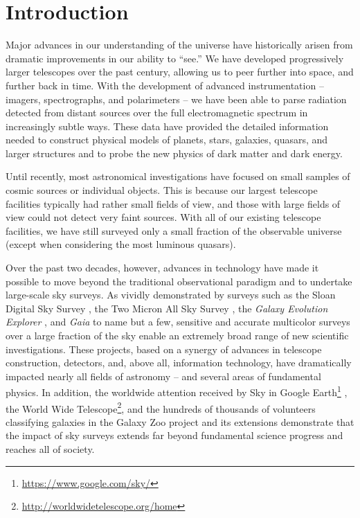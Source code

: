 \section{Introduction}

Major advances in our understanding of the universe have historically arisen
from dramatic improvements in our ability to ``see.'' We have developed
progressively larger telescopes over the past century, allowing us
to peer further into space, and further back in time. With the development of
advanced instrumentation -- imagers, spectrographs, and polarimeters -- we
have been able to parse radiation detected from distant sources over the
full electromagnetic spectrum in increasingly subtle ways.
These data have provided the detailed information needed to construct physical
models of planets, stars, galaxies, quasars, and larger structures and to probe the
new physics of dark matter and dark energy.

Until recently, most astronomical investigations have focused on small samples
of cosmic sources or individual objects. This is because our largest telescope
facilities typically had rather small fields of view, and those with large
fields of view could not detect very faint sources. With all of our existing
telescope facilities, we have still surveyed only a small fraction of the
observable universe (except when considering the most luminous quasars).

Over the past two decades, however, advances in technology have made it possible to
move beyond the traditional observational paradigm and to undertake large-scale
sky surveys. As vividly demonstrated by surveys such as the Sloan Digital Sky
Survey \citep[SDSS;][]{2000AJ....120.1579Y}, the Two Micron All Sky Survey \citep[2MASS;][]{2006AJ....131.1163S},
the \textit{Galaxy Evolution Explorer} \citep[\textit{GALEX};][]{2005ApJ...619L...1M},
and \textit{Gaia} \citep{2016A&A...595A...2G} to name but a few, sensitive and accurate
multicolor surveys over a large fraction of the sky enable an extremely broad range of
new scientific investigations. These projects, based on a synergy of advances in
telescope construction, detectors, and, above all, information technology,
have dramatically impacted nearly all fields of astronomy
-- and several areas of fundamental physics. In addition, the worldwide attention
received by Sky in Google Earth\footnote{\url{https://www.google.com/sky/}}
\citep{2007arXiv0709.0752S}, the World Wide Telescope\footnote{\url{http://worldwidetelescope.org/home}},
and the hundreds of thousands of volunteers
classifying galaxies in the Galaxy Zoo project \citep{2011MNRAS.410..166L}
and its extensions demonstrate that the impact of sky surveys extends
far beyond fundamental science progress and reaches all of society.

